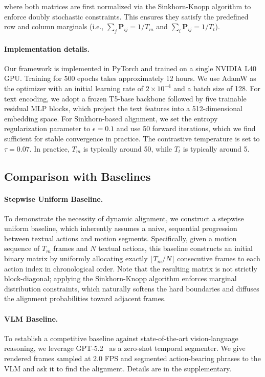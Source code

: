 where both matrices are first normalized via the Sinkhorn-Knopp algorithm to enforce doubly stochastic constraints. This ensures they satisfy the predefined row and column marginals (i.e., $\sum_j {\mathbf{P}}_{ij} = 1/T_m$ and $\sum_i {\mathbf{P}}_{ij} = 1/T_t$).

\paragraph{Implementation details.}
Our framework is implemented in PyTorch and trained on a single NVIDIA L40 GPU. Training for 500 epochs takes approximately 12 hours. We use AdamW as the optimizer with an initial learning rate of $2 \times 10^{-4}$ and a batch size of 128. For text encoding, we adopt a frozen T5-base backbone followed by five trainable residual MLP blocks, which project the text features into a 512-dimensional embedding space. For Sinkhorn-based alignment, we set the entropy regularization parameter to $\epsilon=0.1$ and use 50 forward iterations, which we find sufficient for stable convergence in practice. The contrastive temperature is set to $\tau=0.07$. In practice, $T_m$ is typically around 50, while $T_t$ is typically around 5.\\

\subsection{Comparison with Baselines} 
\paragraph{Stepwise Uniform Baseline.} To demonstrate the necessity of dynamic alignment, we construct a stepwise uniform baseline, which inherently assumes a naive, sequential progression between textual actions and motion segments. Specifically, given a motion sequence of $T_m$ frames and $N$ textual actions, this baseline constructs an initial binary matrix by uniformly allocating exactly $\lfloor T_m / N \rfloor$ consecutive frames to each action index in chronological order. Note that the resulting matrix is not strictly block-diagonal; applying the Sinkhorn-Knopp algorithm enforces marginal distribution constraints, which naturally softens the hard boundaries and diffuses the alignment probabilities toward adjacent frames.

\paragraph{VLM Baseline.} To establish a competitive baseline against state-of-the-art vision-language reasoning, we leverage GPT-5.2~\cite{singh2025openai} as a zero-shot temporal segmenter. We give rendered frames sampled at $2.0$ FPS and segmented action-bearing phrases to the VLM and ask it to find the alignment. Details are in the supplementary.


